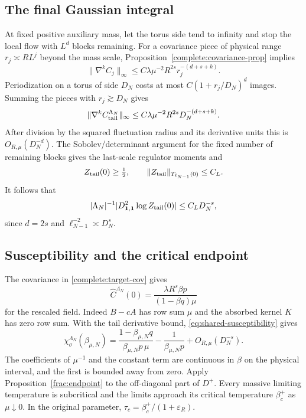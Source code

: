 \documentclass[11pt]{article}
\begin{document}
\subsection{The final Gaussian integral}
At fixed positive auxiliary mass, let the torus side tend to infinity
and stop the local flow with \(L^d\) blocks remaining. For a covariance
piece of physical range \(r_j\asymp RL^j\) beyond the mass scale,
Proposition~\ref{complete:covariance-prop} implies
\[
 \|\nabla^k C_j\|_\infty
       \le C\lambda\mu^{-2}R^{2s}r_j^{-(d+s+k)}.
\]
Periodization on a torus of side \(D_N\) costs at most
\(C(1+r_j/D_N)^d\) images. Summing the pieces with
\(r_j\gtrsim D_N\) gives
\[
 \|\nabla^k C_{\rm tail}^{\Lambda_N}\|_\infty
       \le C\lambda\mu^{-2}R^{2s}D_N^{-(d+s+k)}.
\]
After division by the squared fluctuation radius and its derivative
units this is \(O_{R,\mu}(D_N^{-d})\).
The Sobolev/determinant argument for the fixed number of remaining
blocks gives the last-scale regulator moments and
\[
 Z_{\rm tail}(0)\ge\tfrac12,\qquad
 \|Z_{\rm tail}\|_{T_{\ell_{N-1}}(0)}\le C_L.
\]
It follows that
\begin{equation}\label{frac:tail-derivative-input}
 |\Lambda_N|^{-1}
 |D^2_{\boldsymbol1,\boldsymbol1}\log Z_{\rm tail}(0)|
       \le C_LD_N^{-s},
\end{equation}
since \(d=2s\) and \(\ell_{N-1}^{-2}\asymp D_N^s\).

\subsection{Susceptibility and the critical endpoint}
\label{frac:inputs}
The covariance in \eqref{complete:target-cov} gives
\[
 \widehat C^{\Lambda_N}(0)
   =\frac{\lambda R^s\beta p}{(1-\beta q)\mu}
\]
for the rescaled field. Indeed \(B-cA\) has row sum \(\mu\)
and the absorbed kernel \(K\) has zero row sum. With the
tail derivative bound, \eqref{eq:shared-susceptibility} gives
\begin{equation}\label{frac:suscept-identity}
 \chi_\sigma^{\Lambda_N}(\beta_{\mu,N})
   =\frac{1-\beta_{\mu,N}q}{\beta_{\mu,N}p\,\mu}
       -\frac1{\beta_{\mu,N}p}+O_{R,\mu}(D_N^{-s}).
\end{equation}
The coefficients of \(\mu^{-1}\) and the constant term are continuous
in \(\beta\) on the physical interval, and the first is bounded away
from zero. Apply Proposition~\ref{frac:endpoint} to the off-diagonal
part of \(D^+\). Every massive limiting temperature is subcritical
and the limits approach its critical temperature \(\beta_c^+\) as
\(\mu\downarrow0\). In the original parameter,
\(\tau_c=\beta_c^+/(1+\varepsilon_R)\).
\end{document}
